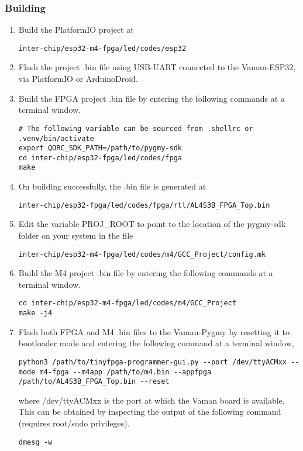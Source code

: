 \subsubsection{Building}
\begin{enumerate}
    \item Build the PlatformIO project at
    \begin{lstlisting}
inter-chip/esp32-m4-fpga/led/codes/esp32
    \end{lstlisting}
    \item Flash the project .bin file using USB-UART connected to the 
    Vaman-ESP32, via PlatformIO or ArduinoDroid.
    \item Build the FPGA project .bin file by entering the following commands at
    a terminal window.
    \begin{lstlisting}
# The following variable can be sourced from .shellrc or .venv/bin/activate
export QORC_SDK_PATH=/path/to/pygmy-sdk
cd inter-chip/esp32-fpga/led/codes/fpga
make
    \end{lstlisting}
    \item On building successfully, the .bin file is generated at
    \begin{lstlisting}
inter-chip/esp32-fpga/led/codes/fpga/rtl/AL4S3B_FPGA_Top.bin
    \end{lstlisting}
    \item Edit the variable PROJ\_ROOT to point to the location of the pygmy-sdk
    folder on your system in the file
    \begin{lstlisting}
inter-chip/esp32-m4-fpga/led/codes/m4/GCC_Project/config.mk
    \end{lstlisting}
    \item Build the M4 project .bin file by entering the following commands at a
    terminal window.
    \begin{lstlisting}
cd inter-chip/esp32-m4-fpga/led/codes/m4/GCC_Project
make -j4
    \end{lstlisting}
    \item Flash both FPGA and M4 .bin files to the Vaman-Pygmy by resetting it
    to bootloader mode and entering the following command at a terminal window,
    \begin{lstlisting}
python3 /path/to/tinyfpga-programmer-gui.py --port /dev/ttyACMxx --mode m4-fpga --m4app /path/to/m4.bin --appfpga /path/to/AL4S3B_FPGA_Top.bin --reset
    \end{lstlisting}
    where /dev/ttyACMxx is the port at which the Vaman board is available. This
    can be obtained by inspecting the output of the following command (requires
    root/sudo privileges).
    \begin{lstlisting}
dmesg -w
    \end{lstlisting}
\end{enumerate}

